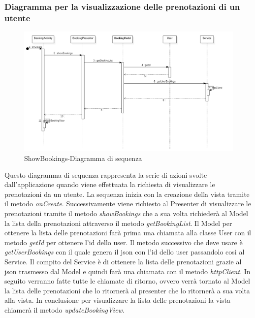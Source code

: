 \subsubsection{Diagramma per la visualizzazione delle prenotazioni di un utente}
\begin{figure}[H]
	\centering
	\includegraphics[width=16cm]{res/images/apputenti-showBookingsSeq.png}
	\caption{ShowBookings-Diagramma di sequenza}
	\label{fig:ShowBookings-Diagramma di sequenza}
\end{figure}
Questo diagramma di sequenza rappresenta la serie di azioni svolte dall'applicazione quando viene effettuata la richiesta di visualizzare le prenotazioni da un utente.
La sequenza inizia con la creazione della vista tramite il metodo \textit{onCreate}. Successivamente viene richiesto al Presenter di visualizzare le prenotazioni tramite il metodo \textit{showBookings} che a sua volta richiederà al Model la lista della prenotazioni attraverso il metodo \textit{getBookingList}.
Il Model per ottenere la lista delle prenotazioni farà prima una chiamata alla classe User con il metodo \textit{getId} per ottenere l'id dello user.
Il metodo successivo che deve usare è \textit{getUserBookings} con il quale genera il json con l'id dello user passandolo così al Service.
Il compito del Service è di ottenere la lista delle prenotazioni grazie al json trasmesso dal Model e quindi farà una chiamata con il metodo \textit{httpClient}.
In seguito verranno fatte tutte le chiamate di ritorno, ovvero verrà tornato al Model la lista delle prenotazioni che lo ritornerà al presenter che lo ritornerà a sua volta alla vista.
In conclusione per visualizzare la lista delle prenotazioni la vista chiamerà il metodo \textit{updateBookingView}. 


